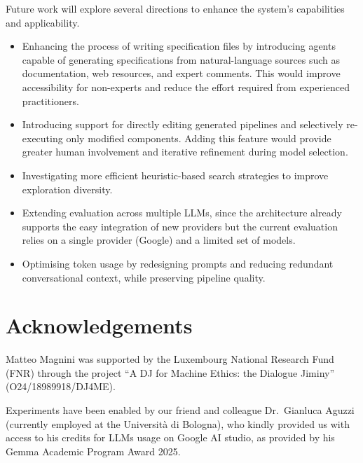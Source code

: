 \documentclass[runningheads]{llncs}
\begin{document}
Future work will explore several directions to enhance the system's capabilities and applicability.

\begin{itemize}
\item Enhancing the process of writing specification files by introducing agents capable of generating specifications from natural-language sources such as documentation, web resources, and expert comments.
This would improve accessibility for non-experts and reduce the effort required from experienced practitioners.
\item Introducing support for directly editing generated pipelines and selectively re-executing only modified components.
Adding this feature would provide greater human involvement and iterative refinement during model selection.
\item Investigating more efficient heuristic-based search strategies to improve exploration diversity.
\item Extending evaluation across multiple \acp{LLM}, since the architecture already supports the easy integration of new providers but the current evaluation relies on a single provider (Google) and a limited set of models.
\item Optimising token usage by redesigning prompts and reducing redundant conversational context, while preserving pipeline quality.
\end{itemize}



\section*{Acknowledgements}

Matteo Magnini was supported by the Luxembourg National Research Fund (FNR)
through the project ``A DJ for Machine Ethics: the Dialogue Jiminy'' (O24/18989918/DJ4ME).

Experiments have been enabled by our friend and colleague Dr.\ Gianluca Aguzzi
(currently employed at the Università di Bologna),
who kindly provided us with access to his credits for \acp{LLM} usage on Google AI studio,
as provided by his Gemma Academic Program Award 2025.



\end{document}
